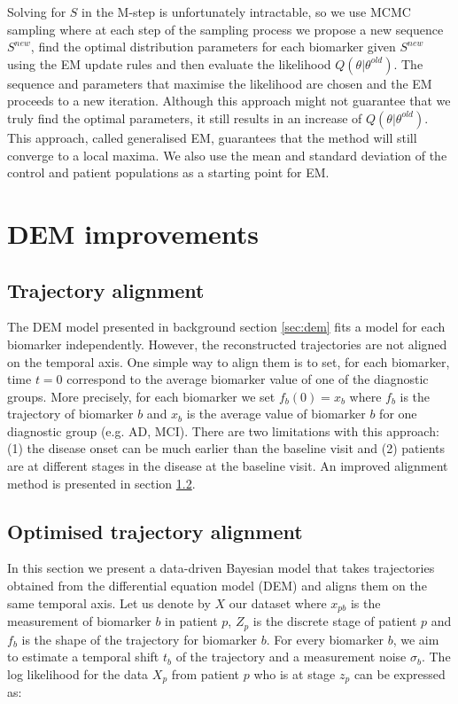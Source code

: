 Solving for $S$ in the M-step is unfortunately intractable, so we use MCMC sampling where at each step of the sampling process we propose a new sequence $S^{new}$, find the optimal distribution parameters for each biomarker given $S^{new}$ using the EM update rules and then evaluate the likelihood $Q(\theta | \theta^{old})$. The sequence and parameters that maximise the likelihood are chosen and the EM proceeds to a new iteration. Although this approach might not guarantee that we truly find the optimal parameters, it still results in an increase of $Q(\theta | \theta^{old})$. This approach, called generalised EM, guarantees that the method will still converge to a local maxima. We also use the mean and standard deviation of the control and patient populations as a starting point for EM. 

\section{DEM improvements}
\label{sec:demImprovements}

\subsection{Trajectory alignment}
\label{sec:demTrajAlignSimple}

The DEM model presented in background section \ref{sec:dem} fits a model for each biomarker independently. However, the reconstructed trajectories are not aligned on the temporal axis. One simple way to align them is to set, for each biomarker, time $t=0$ correspond to the average biomarker value of one of the diagnostic groups. More precisely, for each biomarker we set $f_b(0) = x_b$ where $f_b$ is the trajectory of biomarker $b$ and $x_b$ is the average value of biomarker $b$ for one diagnostic group (e.g. AD, MCI). There are two limitations with this approach: (1) the disease onset can be much earlier than the baseline visit and (2) patients are at different stages in the disease at the baseline visit. An improved alignment method is presented in section \ref{sec:demOptim}.

\subsection{Optimised trajectory alignment}
\label{sec:demOptim}

In this section we present a data-driven Bayesian model that takes trajectories obtained from the differential equation model (DEM) and aligns them on the same temporal axis. Let us denote by $X$ our dataset where $x_{pb}$ is the measurement of biomarker $b$ in patient $p$, $Z_p$ is the discrete stage of patient $p$ and $f_b$ is the shape of the trajectory for biomarker $b$. For every biomarker $b$, we aim to estimate a temporal shift $t_b$ of the trajectory and a measurement noise $\sigma_b$. The log likelihood for the data $X_p$ from patient $p$ who is at stage $z_p$ can be expressed as:

